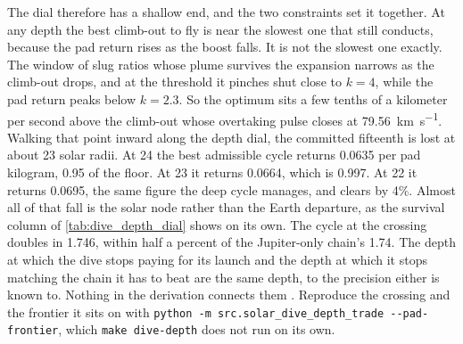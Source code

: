 \documentclass{article}
\begin{document}
The dial therefore has a shallow end, and the two constraints set it together. At any depth the best climb-out to fly is near the slowest one that still conducts, because the pad return rises as the boost falls. It is not the slowest one exactly. The window of slug ratios whose plume survives the expansion narrows as the climb-out drops, and at the threshold it pinches shut close to $k = 4$, while the pad return peaks below $k = 2.3$. So the optimum sits a few tenths of a kilometer per second above the climb-out whose overtaking pulse closes at \SI{79.56}{\kilo\meter\per\second}. Walking that point inward along the depth dial, the committed fifteenth is lost at about 23 solar radii. At 24 the best admissible cycle returns \num{0.0635} per pad kilogram, \num{0.95} of the floor. At 23 it returns \num{0.0664}, which is \num{0.997}. At 22 it returns \num{0.0695}, the same figure the deep cycle manages, and clears by 4\%. Almost all of that fall is the solar node rather than the Earth departure, as the survival column of \autoref{tab:dive_depth_dial} shows on its own. The cycle at the crossing doubles in \SI{1.746}{\year}, within half a percent of the Jupiter-only chain's \SI{1.74}{\year}. The depth at which the dive stops paying for its launch and the depth at which it stops matching the chain it has to beat are the same depth, to the precision either is known to. Nothing in the derivation connects them \cite{Katz_aim_is_all_you_need_2025}. Reproduce the crossing and the frontier it sits on with \texttt{python -m src.solar\_dive\_depth\_trade -{}-pad-frontier}, which \texttt{make dive-depth} does not run on its own.
\end{document}
